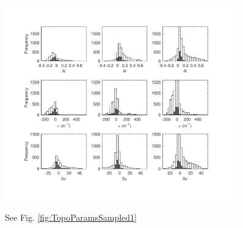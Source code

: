 \documentclass[twocolumn, letterpaper]{igs}
\begin{document}
\begin{figure}
\centering
	\includegraphics[width =0.9\textwidth]{TopoParamsSampled2.pdf}\\
	\caption{See Fig. \ref{fig:TopoParamsSampled1}}
	\label{fig:TopoParamsSampled2}
\end{figure}

\end{document}
